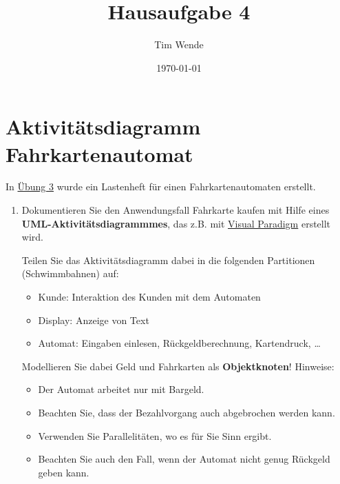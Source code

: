 \documentclass{article}
\author{Tim Wende}
\date{\today}
\title{\textbf{Hausaufgabe 4}}
\newcommand{\gqq}[1]{\glqq{}#1\grqq{}}
\begin{document}
    \maketitle

    \newpage
    \section{Aktivitätsdiagramm Fahrkartenautomat}
    In \href{https://www.ili.fh-aachen.de/ilias.php?ref_id=813760&obj_id=206096&obj_type=PageObject&cmd=layout&cmdClass=illmpresentationgui&cmdNode=gh&baseClass=ilLMPresentationGUI}{Übung 3} wurde ein Lastenheft für einen Fahrkartenautomaten erstellt.\\
    \begin{enumerate}[label=\alph*.]
        \item Dokumentieren Sie den Anwendungsfall \gqq{Fahrkarte kaufen} mit Hilfe eines \textbf{UML-Aktivitätsdiagrammmes}, das z.B. mit \href{https://www.ili.fh-aachen.de/ilias.php?baseClass=ilLinkResourceHandlerGUI&ref_id=341847&cmd=calldirectlink}{Visual Paradigm} erstellt wird.

            Teilen Sie das Aktivitätsdiagramm dabei in die folgenden Partitionen (Schwimmbahnen) auf:
            \begin{itemize}[label=◦]
                \item Kunde: Interaktion des Kunden mit dem Automaten
                \item Display: Anzeige von Text
                \item Automat: Eingaben einlesen, Rückgeldberechnung, Kartendruck, \ldots
            \end{itemize}
            
            Modellieren Sie dabei Geld und Fahrkarten als \textbf{Objektknoten}!
            Hinweise:
            \begin{itemize}[label=◦]
                \item Der Automat arbeitet nur mit Bargeld.
                \item Beachten Sie, dass der Bezahlvorgang auch abgebrochen werden kann.
                \item Verwenden Sie Parallelitäten, wo es für Sie Sinn ergibt.
                \item Beachten Sie auch den Fall, wenn der Automat nicht genug Rückgeld geben kann.
            \end{itemize}


\end{enumerate}
\end{document}
